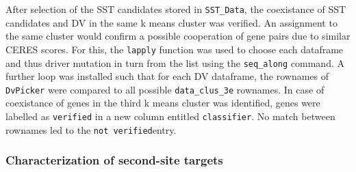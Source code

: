 \documentclass[]{article}
\newenvironment{Shaded}{\begin{snugshade}}{\end{snugshade}}
\newcommand{\CommentTok}[1]{\textcolor[rgb]{0.56,0.35,0.01}{\textit{#1}}}
\newcommand{\ControlFlowTok}[1]{\textcolor[rgb]{0.13,0.29,0.53}{\textbf{#1}}}
\newcommand{\DecValTok}[1]{\textcolor[rgb]{0.00,0.00,0.81}{#1}}
\newcommand{\KeywordTok}[1]{\textcolor[rgb]{0.13,0.29,0.53}{\textbf{#1}}}
\newcommand{\NormalTok}[1]{#1}
\newcommand{\OperatorTok}[1]{\textcolor[rgb]{0.81,0.36,0.00}{\textbf{#1}}}
\newcommand{\StringTok}[1]{\textcolor[rgb]{0.31,0.60,0.02}{#1}}
\begin{document}
After selection of the SST candidates stored in \texttt{SST\_Data}, the
coexistance of SST candidates and DV in the same k means cluster was
verified. An assignment to the same cluster would confirm a possible
cooperation of gene pairs due to similar CERES scores. For this, the
\texttt{lapply} function was used to choose each dataframe and thus
driver mutation in turn from the list using the \texttt{seq\_along}
command. A further loop was installed such that for each DV dataframe,
the rownames of \texttt{DvPicker} were compared to all possible
\texttt{data\_clus\_3e} rownames. In case of coexistance of genes in the
third k means cluster was identified, genes were labelled as
\texttt{verified} in a new column entitled \texttt{classifier}. No match
between rownames led to the \texttt{not\ verified}entry.

\begin{Shaded}
\end{Shaded}

\hypertarget{characterization-of-second-site-targets}{%
\subsubsection{Characterization of second-site
targets}\label{characterization-of-second-site-targets}}
\end{document}
